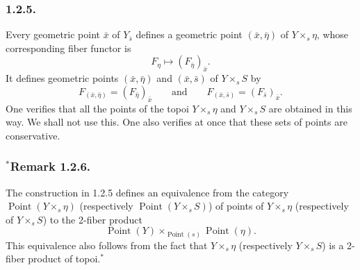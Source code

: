 \subsubsection*{1.2.5.}
Every geometric point $\bar x$ of $Y_{\bar s}$ defines a geometric
point $(\bar x,\bar\eta)$ of $Y\times_s\eta$, whose corresponding
fiber functor is
\begin{equation*}
F_\eta\longmapsto(F_{\bar\eta})_{\bar x}.
\end{equation*}
It defines geometric points $(\bar x,\bar\eta)$ and
$(\bar x,\bar s)$ of $Y\times_sS$ by
\begin{equation*}
F_{(\bar x,\bar\eta)}=(F_{\bar\eta})_{\bar x}
\qquad\text{and}\qquad
F_{(\bar x,\bar s)}=(F_{\bar s})_{\bar x}.
\end{equation*}
One verifies that all the points of the topoi $Y\times_s\eta$ and
$Y\times_sS$ are obtained in this way.  We shall not use this.  One
also verifies at once that these sets of points are conservative.

\subsubsection*{${}^{*}$Remark 1.2.6.}
The construction in 1.2.5 defines an equivalence from the category
$\operatorname{Point}(Y\times_s\eta)$ (respectively
$\operatorname{Point}(Y\times_sS)$) of points of $Y\times_s\eta$
(respectively of $Y\times_sS$) to the 2-fiber product
\begin{equation*}
\operatorname{Point}(Y)\times_{\operatorname{Point}(s)}
\operatorname{Point}(\eta).
\end{equation*}
This equivalence also follows from the fact that $Y\times_s\eta$
(respectively $Y\times_sS$) is a 2-fiber product of topoi.${}^{*}$

